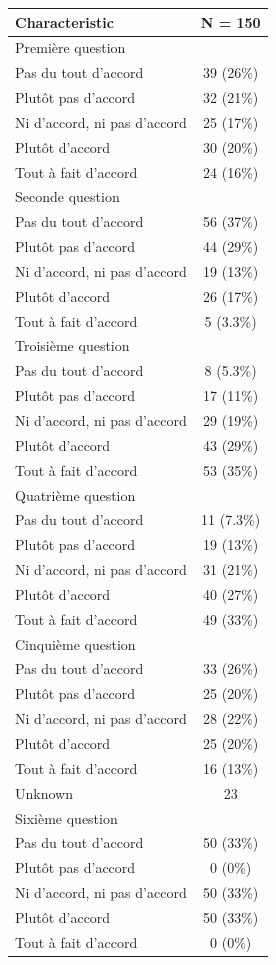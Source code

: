 \documentclass[
  letterpaper,
  DIV=11,
  numbers=noendperiod,
  oneside]{scrreprt}
\begin{document}
\begin{longtable}[]{@{}lc@{}}
\toprule()
\textbf{Characteristic} & \textbf{N = 150} \\
\midrule()
\endhead
Première question & \\
Pas du tout d'accord & 39 (26\%) \\
Plutôt pas d'accord & 32 (21\%) \\
Ni d'accord, ni pas d'accord & 25 (17\%) \\
Plutôt d'accord & 30 (20\%) \\
Tout à fait d'accord & 24 (16\%) \\
Seconde question & \\
Pas du tout d'accord & 56 (37\%) \\
Plutôt pas d'accord & 44 (29\%) \\
Ni d'accord, ni pas d'accord & 19 (13\%) \\
Plutôt d'accord & 26 (17\%) \\
Tout à fait d'accord & 5 (3.3\%) \\
Troisième question & \\
Pas du tout d'accord & 8 (5.3\%) \\
Plutôt pas d'accord & 17 (11\%) \\
Ni d'accord, ni pas d'accord & 29 (19\%) \\
Plutôt d'accord & 43 (29\%) \\
Tout à fait d'accord & 53 (35\%) \\
Quatrième question & \\
Pas du tout d'accord & 11 (7.3\%) \\
Plutôt pas d'accord & 19 (13\%) \\
Ni d'accord, ni pas d'accord & 31 (21\%) \\
Plutôt d'accord & 40 (27\%) \\
Tout à fait d'accord & 49 (33\%) \\
Cinquième question & \\
Pas du tout d'accord & 33 (26\%) \\
Plutôt pas d'accord & 25 (20\%) \\
Ni d'accord, ni pas d'accord & 28 (22\%) \\
Plutôt d'accord & 25 (20\%) \\
Tout à fait d'accord & 16 (13\%) \\
Unknown & 23 \\
Sixième question & \\
Pas du tout d'accord & 50 (33\%) \\
Plutôt pas d'accord & 0 (0\%) \\
Ni d'accord, ni pas d'accord & 50 (33\%) \\
Plutôt d'accord & 50 (33\%) \\
Tout à fait d'accord & 0 (0\%) \\
\bottomrule()
\end{longtable}
\end{document}
